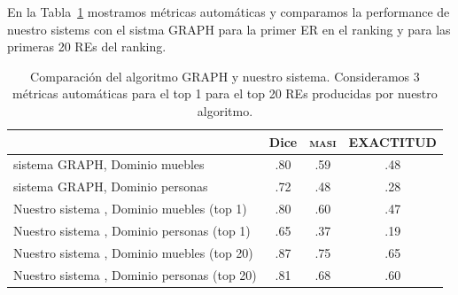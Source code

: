 En la Tabla~\ref{Tabla_sis_1_20} mostramos m\'etricas autom\'aticas y comparamos la performance de nuestro sistems con el sistma GRAPH para la primer ER en el ranking y para las primeras 20 REs del ranking. 

\begin{table}[h!]
\begin{center}
\begin{tabular}{|l|c|c|c|}
\hline
	 	& 	Dice		&	\textsc{masi}	&	EXACTITUD		\\
\hline
sistema GRAPH, Dominio muebles	& 	.80 		&	.59	&	.48		 	\\
sistema GRAPH, Dominio personas 	& 	.72		&	.48	&	.28			\\
\hline
Nuestro sistema , Dominio muebles (top 1)	&	.80		&	.60	&	.47		\\
Nuestro sistema , Dominio personas (top 1)	&	.65		&	.37	&	.19		\\
\hline
Nuestro sistema , Dominio muebles (top 20)&	.87		&	.75  	&	.65		\\
Nuestro sistema , Dominio personas (top 20)   &	.81		&	.68	&	.60		\\
\hline
\end{tabular}
\caption{Comparaci\'on del algoritmo GRAPH y nuestro sistema. Consideramos 3 m\'etricas autom\'aticas para el top 1 para el top 20 REs producidas por nuestro algoritmo.}
\vspace*{-.5cm}
\label{Tabla_sis_1_20}
\end{center}
\end{table}
\vspace*{-.5cm}



